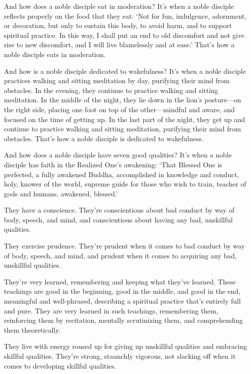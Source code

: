 \documentclass[12pt,openany]{book}%
\begin{document}
And how does a noble disciple eat in moderation? It’s when a noble disciple reflects properly on the food that they eat: ‘Not for fun, indulgence, adornment, or decoration, but only to sustain this body, to avoid harm, and to support spiritual practice. In this way, I shall put an end to old discomfort and not give rise to new discomfort, and I will live blamelessly and at ease.’ That’s how a noble disciple eats in moderation. 

And how is a noble disciple dedicated to wakefulness? It’s when a noble disciple practices walking and sitting meditation by day, purifying their mind from obstacles. In the evening, they continue to practice walking and sitting meditation. In the middle of the night, they lie down in the lion’s posture—on the right side, placing one foot on top of the other—mindful and aware, and focused on the time of getting up. In the last part of the night, they get up and continue to practice walking and sitting meditation, purifying their mind from obstacles. That’s how a noble disciple is dedicated to wakefulness. 

And how does a noble disciple have seven good qualities? It’s when a noble disciple has faith in the Realized One’s awakening: ‘That Blessed One is perfected, a fully awakened Buddha, accomplished in knowledge and conduct, holy, knower of the world, supreme guide for those who wish to train, teacher of gods and humans, awakened, blessed.’ 

They have a conscience. They’re conscientious about bad conduct by way of body, speech, and mind, and conscientious about having any bad, unskillful qualities. 

They exercise prudence. They’re prudent when it comes to bad conduct by way of body, speech, and mind, and prudent when it comes to acquiring any bad, unskillful qualities. 

They’re very learned, remembering and keeping what they’ve learned. These teachings are good in the beginning, good in the middle, and good in the end, meaningful and well-phrased, describing a spiritual practice that’s entirely full and pure. They are very learned in such teachings, remembering them, reinforcing them by recitation, mentally scrutinizing them, and comprehending them theoretically. 

They live with energy roused up for giving up unskillful qualities and embracing skillful qualities. They’re strong, staunchly vigorous, not slacking off when it comes to developing skillful qualities. 
\end{document}

